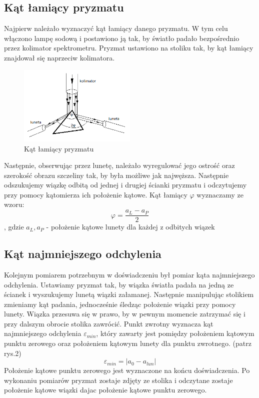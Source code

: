 \documentclass[a4paper,10pt]{article}
\begin{document}
\subsection{Kąt łamiący pryzmatu}
Najpierw należało wyznaczyć kąt łamiący danego pryzmatu. W tym celu włączono lampę sodową i postawiono ją tak, by światło padało bezpośrednio przez kolimator spektrometru. Pryzmat ustawiono na stoliku tak, by kąt łamiący znajdował się naprzeciw kolimatora. 
\begin{figure} [H]
  \centering
  \includegraphics[width=0.5\textwidth]{./phi.png}
  \caption{Kąt łamiący pryzmatu}
  \label{}
\end{figure}
Następnie, obserwując %
przez lunetę, należało wyregulować jego ostrość oraz szerokość obrazu szczeliny tak, by była możliwe jak najwęższa. Następnie odszukujemy wiązkę odbitą od jednej i drugiej ścianki pryzmatu i odczytujemy przy pomocy kątomierza ich położenie kątowe. Kąt łamiący $\varphi$ wyznaczamy ze wzoru:
\begin{equation}
\varphi = \frac{a_L - a_P}{2}
\end{equation}
, gdzie $a_L, a_P$ - położenie kątowe lunety dla każdej z odbitych wiązek

\subsection{Kąt najmniejszego odchylenia}
Kolejnym pomiarem potrzebnym w doświadczeniu był pomiar kąta najmniejszego odchylenia. Ustawiamy pryzmat tak, by wiązka światła padała na jedną ze ścianek i wyszukujemy lunetą wiązki załamanej. Następnie manipulując stolikiem zmieniamy kąt padania, jednocześnie śledząc położenie wiązki przy pomocy lunety. Wiązka przesuwa się w prawo, by w pewnym momencie zatrzymać się i przy dalszym obrocie stolika zawrócić. Punkt zwrotny wyznacza kąt najmniejszego odchylenia $\varepsilon_{min}$, który zawarty jest pomiędzy położeniem kątowym punktu zerowego oraz położeniem kątowym lunety dla punktu zwrotnego. (patrz rys.2)
\begin{equation}
\varepsilon_{min} = |a_0 - a_{lun}|
\end{equation}
Położenie kątowe punktu zerowego jest wyznaczone na końcu doświadczenia. Po wykonaniu pomiarów pryzmat zostaje zdjęty ze stolika i odczytane zostaje położenie kątowe wiązki dajac położenie kątowe punktu zerowego.
\end{document}
